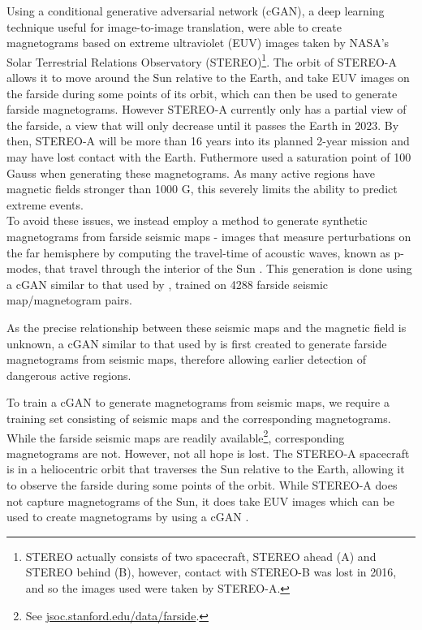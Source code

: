 \documentclass[11pt,a4paper,onecolumn]{report}
\begin{document}
Using a conditional generative adversarial network (cGAN), a deep learning
technique useful for image-to-image translation, \citet{Kim2019} were able to
create magnetograms based on extreme ultraviolet (EUV) images taken by NASA's
Solar Terrestrial Relations Observatory (STEREO)\footnote{STEREO actually
consists of two spacecraft, STEREO ahead (A) and STEREO behind (B), however,
contact with STEREO-B was lost in 2016, and so the images used were taken by
STEREO-A.}. The orbit of STEREO-A allows it to move around the Sun relative to
the Earth, and take EUV images on the farside during some points of its orbit,
which can then be used to generate farside magnetograms. However STEREO-A
currently only has a partial view of the farside, a view that will only decrease
until it passes the Earth in 2023. By then, STEREO-A will be more than 16 years
into its planned 2-year mission and may have lost contact with the Earth.
Futhermore \citet{Kim2019} used a saturation point of 100 Gauss when generating
these magnetograms. As many active regions have magnetic fields stronger than
1000 G, this severely limits the ability to predict extreme events.\\


To avoid these issues, we instead employ a method to generate synthetic
magnetograms from farside seismic maps - images that measure perturbations on
the far hemisphere by computing the travel-time of acoustic waves, known as
p-modes, that travel through the interior of the Sun \citep{Lindsey2017}. This
generation is done using a cGAN similar to that used by \citet{Kim2019}, trained
on 4288 farside seismic map/magnetogram pairs. 


As the
precise relationship between these seismic maps and the magnetic field is
unknown, a cGAN similar to that used by \citet{Kim2019} is first created to
generate farside magnetograms from seismic maps, therefore allowing earlier
detection of dangerous active regions.




%
%

To train a cGAN to generate magnetograms from seismic maps, we require a
training set consisting of seismic maps and the corresponding magnetograms.
While the farside seismic maps are readily available\footnote{See
  \url{jsoc.stanford.edu/data/farside}.}, corresponding magnetograms are
not. However, not all hope is lost. The STEREO-A spacecraft is in a heliocentric
orbit that traverses the Sun relative to the Earth, allowing it to observe the
farside during some points of the orbit. While STEREO-A does not capture
magnetograms of the Sun, it does take EUV images which can be used to create
magnetograms by using a cGAN \citep{Kim2019}.\\
\end{document}
